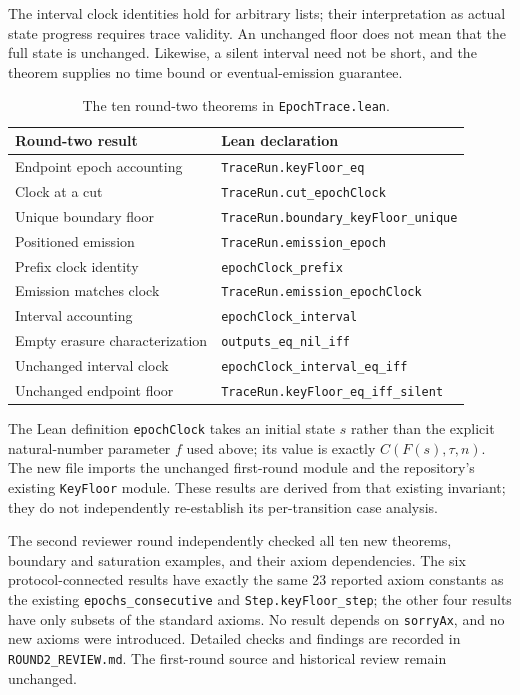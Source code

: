 \documentclass[11pt]{article}
\begin{document}
The interval clock identities hold for arbitrary lists; their interpretation as actual
state progress requires trace validity. An unchanged floor does not mean that the full
state is unchanged. Likewise, a silent interval need not be short, and the theorem supplies
no time bound or eventual-emission guarantee.

\begin{table}[ht]
\centering\small
\begin{tabular}{ll}
\toprule
Round-two result & Lean declaration \\
\midrule
Endpoint epoch accounting & \texttt{TraceRun.keyFloor\_eq} \\
Clock at a cut & \texttt{TraceRun.cut\_epochClock} \\
Unique boundary floor & \texttt{TraceRun.boundary\_keyFloor\_unique} \\
Positioned emission & \texttt{TraceRun.emission\_epoch} \\
Prefix clock identity & \texttt{epochClock\_prefix} \\
Emission matches clock & \texttt{TraceRun.emission\_epochClock} \\
Interval accounting & \texttt{epochClock\_interval} \\
Empty erasure characterization & \texttt{outputs\_eq\_nil\_iff} \\
Unchanged interval clock & \texttt{epochClock\_interval\_eq\_iff} \\
Unchanged endpoint floor & \texttt{TraceRun.keyFloor\_eq\_iff\_silent} \\
\bottomrule
\end{tabular}
\caption{The ten round-two theorems in \texttt{EpochTrace.lean}.}
\end{table}

The Lean definition \texttt{epochClock} takes an initial state $s$ rather than the
explicit natural-number parameter $f$ used above; its value is exactly $C(F(s),\tau,n)$.
The new file imports the unchanged first-round module and the repository's existing
\texttt{KeyFloor} module. These results are derived from that existing invariant;
they do not independently re-establish its per-transition case analysis.

The second reviewer round independently checked all ten new theorems, boundary and
saturation examples, and their axiom dependencies. The six protocol-connected results have
exactly the same 23 reported axiom constants as the existing
\texttt{epochs\_consecutive} and \texttt{Step.keyFloor\_step}; the other four
results have only subsets of the standard axioms. No result depends on
\texttt{sorryAx}, and no new axioms were introduced. Detailed checks and findings are
recorded in \texttt{ROUND2\_REVIEW.md}. The first-round source and historical
review remain unchanged.
\end{document}
